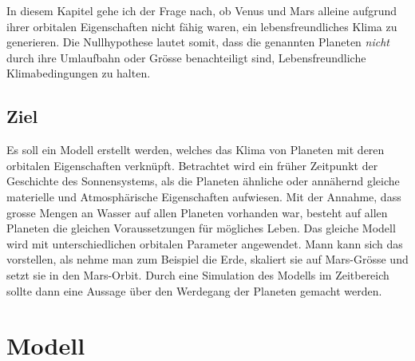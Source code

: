 \begin{refsection}
In diesem Kapitel gehe ich der Frage nach, ob Venus und Mars alleine aufgrund ihrer orbitalen Eigenschaften nicht fähig waren, ein lebensfreundliches Klima zu generieren. Die Nullhypothese lautet somit, dass die genannten Planeten \textit{nicht} durch ihre Umlaufbahn oder Grösse benachteiligt sind, Lebensfreundliche Klimabedingungen zu halten.



\subsection{Ziel}
Es soll ein Modell erstellt werden, welches das Klima von Planeten mit deren orbitalen Eigenschaften verknüpft.
Betrachtet wird ein früher Zeitpunkt der Geschichte des Sonnensystems, als die Planeten ähnliche oder annähernd gleiche materielle und Atmosphärische Eigenschaften aufwiesen.
Mit der Annahme, dass grosse Mengen an Wasser auf allen Planeten vorhanden war, besteht auf allen Planeten die gleichen Voraussetzungen für mögliches Leben.
Das gleiche Modell wird mit unterschiedlichen orbitalen Parameter angewendet. Mann kann sich das vorstellen, als nehme man zum Beispiel die Erde, skaliert sie auf Mars-Grösse und setzt sie in den Mars-Orbit. 
Durch eine Simulation des Modells im Zeitbereich sollte dann eine Aussage über den Werdegang der Planeten gemacht werden.




%
%
%

\section{Modell}



\end{refsection}
